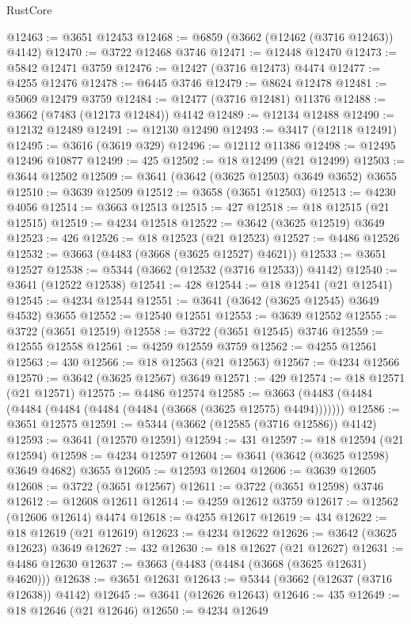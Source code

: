\begin{lexlean}{RustCore}
\begin{coremodule}
@12463 := @3651 @12453
@12468 := @6859 (@3662 (@12462 (@3716 @12463)) @4142)
@12470 := @3722 @12468 @3746
@12471 := @12448 @12470
@12473 := @5842 @12471 @3759
@12476 := @12427 (@3716 @12473) @4474
@12477 := @4255 @12476
@12478 := @6445 @3746
@12479 := @8624 @12478
@12481 := @5069 @12479 @3759
@12484 := @12477 (@3716 @12481) @11376
@12488 := @3662 (@7483 (@12173 @12484)) @4142
@12489 := @12134 @12488
@12490 := @12132 @12489
@12491 := @12130 @12490
@12493 := @3417 (@12118 @12491)
@12495 := @3616 (@3619 @329)
@12496 := @12112 @11386
@12498 := @12495 @12496 @10877
@12499 := 425
@12502 := @18 @12499 (@21 @12499)
@12503 := @3644 @12502
@12509 := @3641 (@3642 (@3625 @12503) @3649 @3652) @3655
@12510 := @3639 @12509
@12512 := @3658 (@3651 @12503)
@12513 := @4230 @4056
@12514 := @3663 @12513
@12515 := 427
@12518 := @18 @12515 (@21 @12515)
@12519 := @4234 @12518
@12522 := @3642 (@3625 @12519) @3649
@12523 := 426
@12526 := @18 @12523 (@21 @12523)
@12527 := @4486 @12526
@12532 := @3663 (@4483 (@3668 (@3625 @12527) @4621))
@12533 := @3651 @12527
@12538 := @5344 (@3662 (@12532 (@3716 @12533)) @4142)
@12540 := @3641 (@12522 @12538)
@12541 := 428
@12544 := @18 @12541 (@21 @12541)
@12545 := @4234 @12544
@12551 := @3641 (@3642 (@3625 @12545) @3649 @4532) @3655
@12552 := @12540 @12551
@12553 := @3639 @12552
@12555 := @3722 (@3651 @12519)
@12558 := @3722 (@3651 @12545) @3746
@12559 := @12555 @12558
@12561 := @4259 @12559 @3759
@12562 := @4255 @12561
@12563 := 430
@12566 := @18 @12563 (@21 @12563)
@12567 := @4234 @12566
@12570 := @3642 (@3625 @12567) @3649
@12571 := 429
@12574 := @18 @12571 (@21 @12571)
@12575 := @4486 @12574
@12585 := @3663 (@4483 (@4484 (@4484 (@4484 (@4484 (@4484 (@3668 (@3625 @12575) @4494)))))))
@12586 := @3651 @12575
@12591 := @5344 (@3662 (@12585 (@3716 @12586)) @4142)
@12593 := @3641 (@12570 @12591)
@12594 := 431
@12597 := @18 @12594 (@21 @12594)
@12598 := @4234 @12597
@12604 := @3641 (@3642 (@3625 @12598) @3649 @4682) @3655
@12605 := @12593 @12604
@12606 := @3639 @12605
@12608 := @3722 (@3651 @12567)
@12611 := @3722 (@3651 @12598) @3746
@12612 := @12608 @12611
@12614 := @4259 @12612 @3759
@12617 := @12562 (@12606 @12614) @4474
@12618 := @4255 @12617
@12619 := 434
@12622 := @18 @12619 (@21 @12619)
@12623 := @4234 @12622
@12626 := @3642 (@3625 @12623) @3649
@12627 := 432
@12630 := @18 @12627 (@21 @12627)
@12631 := @4486 @12630
@12637 := @3663 (@4483 (@4484 (@3668 (@3625 @12631) @4620)))
@12638 := @3651 @12631
@12643 := @5344 (@3662 (@12637 (@3716 @12638)) @4142)
@12645 := @3641 (@12626 @12643)
@12646 := 435
@12649 := @18 @12646 (@21 @12646)
@12650 := @4234 @12649

\end{coremodule}
\end{lexlean}
